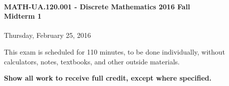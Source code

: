 \documentclass[12pt]{article}
\begin{document}
\thispagestyle{firststyle}
~
\vspace{0.5cm}

\begin{center}
\textbf{\Large MATH-UA.120.001 - Discrete Mathematics 2016 Fall\\ \vspace{0.5cm} Midterm 1}\\~\\
Thursday, February 25, 2016
\end{center}

\vspace{1cm}


\vspace{1cm}

\noindent
This exam is scheduled for 110 minutes, to be done individually, without calculators, notes, textbooks, and other outside materials.
\vspace{0.5cm}

\noindent
\textbf{Show all work to receive full credit, except where specified.}

\vspace{1cm}
\end{document}
